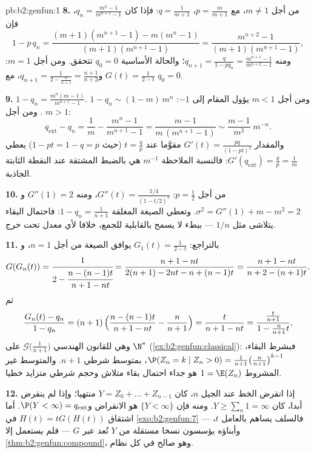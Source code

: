 \begin{solution}{pb:b2:genfun:1}
\textbf{8.} من أجل $m \neq 1$، مع $p = \frac m{m+1}$، $q =
\frac1{m+1}$: فإذا كان $q_n = \frac{m^n - 1}{m^{n+1} - 1}$،
فإن
\[
1 - p\,q_n = \frac{(m+1)(m^{n+1} - 1) - m(m^n - 1)}
{(m+1)(m^{n+1} - 1)} = \frac{m^{n+2} - 1}{(m+1)(m^{n+1} -
1)},
\]
ومنه $q_{n+1} = \frac{q}{1 - pq_n} = \frac{m^{n+1} -
1}{m^{n+2} - 1}$؛ والحالة الأساسية $q_0 = 0$ تتحقق. ومن أجل $m = 1$: $G(t) = \frac1{2 - t}$
و$q_{n+1} = \frac1{2 -
\frac{n}{n+1}} = \frac{n+1}{n+2}$، مع $q_0 = 0$.

\textbf{9.} $1 - q_n = \frac{m^n(m - 1)}{m^{n+1} - 1}$. ومن أجل $m < 1$ يؤول المقام إلى $-1$: $1 - q_n \sim (1 -
m)\,m^n$.
ومن أجل $m > 1$:
\[
q_{\mathrm{ext}} - q_n = \frac1m - \frac{m^n - 1}{m^{n+1} -
1} = \frac{m - 1}{m\,(m^{n+1} - 1)} \sim \frac{m -
1}{m^{2}}\;m^{-n} .
\]
والمقدار $G'(t) = \frac{pq}{(1 - pt)^2}$ مقوَّما عند $t = \frac
qp$ (حيث $1 - pt = 1 - q = p$) يعطي $G'(q_{\mathrm{ext}})
= \frac qp = \frac1m$:
فالنسبة الملاحظة $m^{-1}$ هي بالضبط المشتقة عند النقطة الثابتة
الجاذبة.

\textbf{10.} من أجل $p = \frac12$: $G''(t) = \frac{1/4}{(1 -
t/2)^3}$، ومنه $G''(1) = 2$ و$\sigma^2 = G''(1) + m - m^2 =
2$. وتعطي
الصيغة المغلقة $1 - q_n = \frac1{n+1}$: فاحتمال البقاء يتلاشى مثل $1/n$ --- ببطء
لا يسمح بالقابلية للجمع، خلافا لأي معدل تحت حرج.

\textbf{11.} بالتراجع: $G_1(t) = \frac1{2-t}$ يوافق الصيغة من أجل $n = 1$، و
\[
G(G_n(t)) = \cfrac{1}{2 - \cfrac{n - (n-1)t}{n+1 - nt}}
= \frac{n + 1 - nt}{2(n+1) - 2nt - n + (n-1)t}
= \frac{n+1 - nt}{n + 2 - (n+1)t} .
\]
ثم
\[
\frac{G_n(t) - q_n}{1 - q_n}
= (n+1)\,\Bigl(\frac{n - (n-1)t}{n+1 - nt} -
\frac{n}{n+1}\Bigr)
= \frac{t}{n + 1 - nt}
= \frac{\frac{t}{n+1}}{1 - \frac{n}{n+1}t} ,
\]
وهي  للقانون الهندسي $\mathcal G\bigl(\frac1{n+1}
\bigr)$ على $\N^*$ (\cref{ex:b2:genfun:classical}):
فبشرط البقاء، $\P(Z_n = k \mid Z_n > 0) =
\frac1{n+1}\bigl(\frac n{n+1}\bigr)^{k-1}$، بمتوسط شرطي $n + 1$. والمتوسط غير المشروط
$1 = \E(Z_n)$ هو جداء احتمال بقاء متلاش وحجم شرطي متزايد خطيا.

\textbf{12.} إذا انقرض الخط عند الجيل $n$، كان $Y = Z_0 + \dots + Z_{n-1}$ منتهيا؛
وإذا لم ينقرض أبدا، كان $Y \geq \sum_n 1 = \infty$. ومنه فإن $\{Y < \infty\}$ هو  الانقراض
و$\P(Y < \infty) = q_{\mathrm{ext}}$. أما اشتقاق $H(t) = tG(H(t))$ في \cref{exo:b2:genfun:7} --- فالسلف يساهم بالعامل
$t$، وأبناؤه يؤسسون نسخا مستقلة من $Y$ تُعد عبر $G$ ---
فلم يستعمل إلا \cref{thm:b2:genfun:compound}، وهو صالح في كل نظام.


\end{solution}
